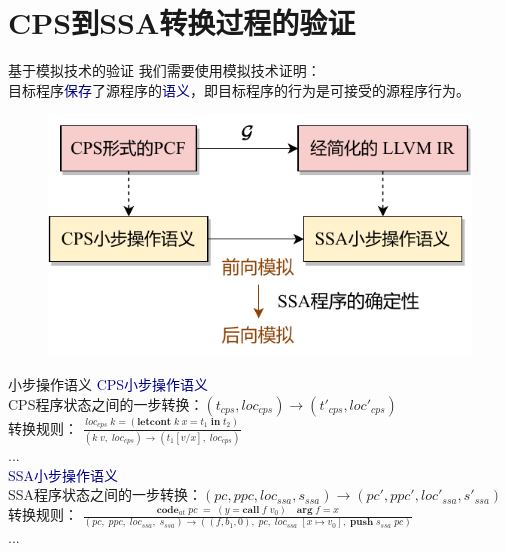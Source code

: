 
\section{CPS到SSA转换过程的验证}

\begin{frame}{基于模拟技术的验证}
    我们需要使用模拟技术证明：\\
    \vspace{1ex}
    目标程序\textcolor{DarkBlue}{保存}了源程序的\textcolor{DarkBlue}{语义}，即目标程序的行为是可接受的源程序行为。
    \begin{figure}
        \centering
        \includegraphics[width=0.55\linewidth]{figures/extracts.pdf}
    \end{figure}
\end{frame}

\begin{frame}{小步操作语义}
    \large
    \textcolor{DarkBlue}{CPS小步操作语义}\\
    \normalsize
    \vspace{1ex}
    \centering
    CPS程序状态之间的一步转换：$(t_{cps},loc_{cps})\rightarrow(t'_{cps},loc'_{cps})$\\
    \vspace{1ex}
    转换规则：
    $\displaystyle{\frac{loc_{cps}\; k = (\mathbf{letcont}\; k\; x=t_1\; \mathbf{in}\; t_2)}{(k\; v,\; loc_{cps})\rightarrow (t_1 [v/x],\; loc_{cps})}}$ \\
    \vspace{1ex}
    ...\\
    \flushleft
    \textcolor{DarkBlue}{SSA小步操作语义}\\
    \vspace{1ex}
    \centering
    SSA程序状态之间的一步转换：$(pc,ppc,loc_{ssa},s_{ssa})\rightarrow (pc',ppc',loc'_{ssa},s'_{ssa})$\\
    \vspace{1ex}
    \centering 
    转换规则：
    $\displaystyle{\frac{\mathbf{code}_{at}\; pc\; =\; (y=\mathbf{call}\; f\; v_0)\quad \mathbf{arg}\; f = x}{(pc,\; ppc,\; loc_{ssa},\; s_{ssa})\rightarrow ((f,b_1,0),\; pc,\; loc_{ssa}\; [x\mapsto v_0],\; \mathbf{push}\; s_{ssa}\; pc )}}$ \\
    \vspace{1ex}
     ...\\
\end{frame}

